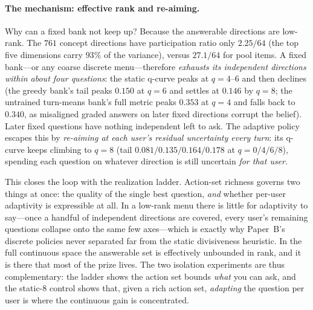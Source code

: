 \documentclass[11pt]{article}
\begin{document}
\paragraph{The mechanism: effective rank and re-aiming.} Why can a fixed bank not keep up? Because the answerable
directions are low-rank. The $761$ concept directions have participation ratio only $2.25/64$ (the top five dimensions
carry $93\%$ of the variance), versus $27.1/64$ for pool items. A fixed bank---or any coarse discrete menu---therefore
\emph{exhausts its independent directions within about four questions}: the static q-curve peaks at $q{=}4$--$6$ and then
declines (the greedy bank's tail peaks $0.150$ at $q{=}6$ and settles at $0.146$ by $q{=}8$; the untrained turn-means
bank's full metric peaks $0.353$ at $q{=}4$ and falls back to $0.340$, as misaligned graded answers on later fixed
directions corrupt the belief). Later fixed questions have nothing independent left to ask. The adaptive policy escapes
this by \emph{re-aiming at each user's residual uncertainty every turn}: its q-curve keeps climbing to $q{=}8$
(tail $0.081/0.135/0.164/0.178$ at $q{=}0/4/6/8$), spending each question on whatever direction is still uncertain
\emph{for that user}.

This closes the loop with the realization ladder. Action-set richness governs two things at once: the quality of the
single best question, \emph{and} whether per-user adaptivity is expressible at all. In a low-rank menu there is little
for adaptivity to say---once a handful of independent directions are covered, every user's remaining questions collapse
onto the same few axes---which is exactly why Paper~B's discrete policies never separated far from the static
divisiveness heuristic. In the full continuous space the answerable set is effectively unbounded in rank, and it is there
that most of the prize lives. The two isolation experiments are thus complementary: the ladder shows the action set
bounds \emph{what} you can ask, and the static-8 control shows that, given a rich action set, \emph{adapting} the
question per user is where the continuous gain is concentrated.
\end{document}
